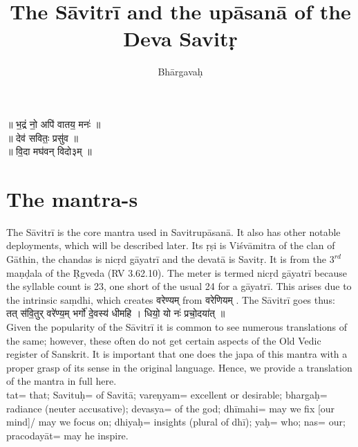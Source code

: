 \documentclass[12pt]{article}
\title{\textbf{The Sāvitrī and the upāsanā of the Deva Savitṛ}}
\author{Bhārgavaḥ }
\date{}
\begin{document}
\maketitle

\begin{center}
{\skt
॥ भ॒द्रं नो॒ अपि॑ वातय॒ मनः॑ ॥\\
॥ देव॑ सवितः॒ प्रसु॑व ॥\\
॥ वि॒दा मघ॑वन् विदो३म् ॥
}\\
 \end{center}

\section{The mantra-s} 
The Sāvitrī is the core mantra used in Savitrupāsanā. It also has other notable deployments, which will be described later. Its ṛṣi is Viśvāmitra of the clan of Gāthin, the chandas is nicṛd gāyatrī and the devatā is Savitṛ. It is from the $3^{rd}$ maṇḍala of the Ṛgveda (RV 3.62.10). The meter is termed  nicṛd gāyatrī because the syllable count is 23, one short of the usual 24 for a gāyatrī. This arises due to the intrinsic saṃdhi, which creates {\skt वरेण्यम्} from {\skt वरेणियम् }. The Sāvitrī goes thus:\\
{\skt
तत् स॑वि॒तुर् वरे॑ण्य॒म् भर्गो॑ दे॒वस्य॑ धीमहि । धियो॒ यो नः॑ प्रचो॒दया॑त् ॥
}\\[10pt]
Given the popularity of the Sāvitrī it is common to see numerous translations of the same; however, these often do not get certain aspects of the Old Vedic register of Sanskrit. It is important that one does the japa of this mantra with a proper grasp of its sense in the original language. Hence, we provide a translation of the mantra in full here.\\[8pt]
tat= that; Savituḥ= of Savitā; vareṇyam= excellent or desirable; bhargaḥ= radiance (neuter accusative); devasya= of the god; dhīmahi= may we fix [our mind]/ may we focus on; dhiyaḥ= insights (plural of dhī); yaḥ= who; nas= our; pracodayāt= may he inspire.\\
\end{document}
